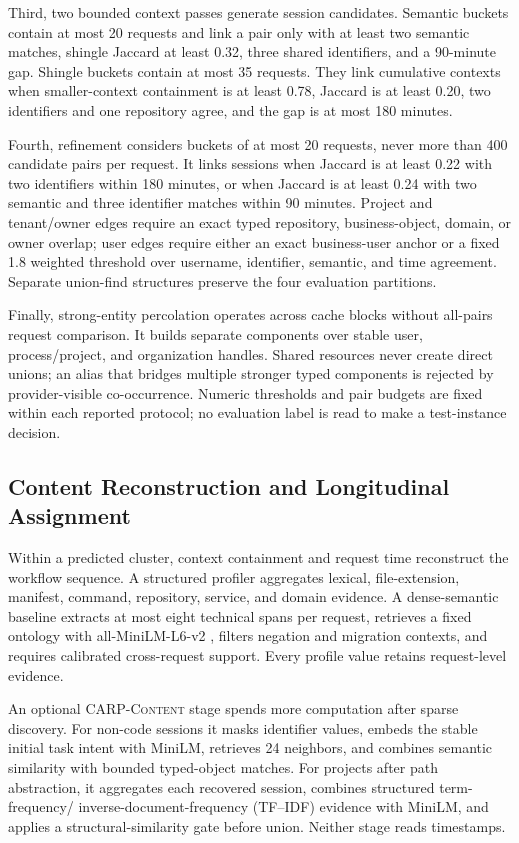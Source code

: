 \documentclass[letterpaper]{article}
\newcommand{\carpcontent}{\textsc{CARP-Content}\xspace}
\begin{document}
Third, two bounded context passes generate session candidates. Semantic buckets contain at most 20
requests and link a pair only with at least two semantic matches, shingle Jaccard at least 0.32,
three shared identifiers, and a 90-minute gap. Shingle buckets contain at most 35 requests. They link
cumulative contexts when smaller-context containment is at least 0.78, Jaccard is at least 0.20, two
identifiers and one repository agree, and the gap is at most 180 minutes.

Fourth, refinement considers buckets of at most 20 requests, never more than 400 candidate pairs
per request. It links sessions when Jaccard is at least 0.22 with two identifiers within 180
minutes, or when Jaccard is at least 0.24 with two semantic and three identifier matches within 90
minutes. Project and tenant/owner edges require an exact
typed repository, business-object, domain, or owner overlap; user edges require either an exact
business-user anchor or a fixed 1.8 weighted threshold over username, identifier, semantic, and
time agreement. Separate union-find structures preserve the four evaluation partitions.

Finally, strong-entity percolation operates across cache blocks without all-pairs request
comparison. It builds separate components over stable user, process/project, and organization
handles. Shared resources never create direct unions; an alias that bridges multiple stronger typed
components is rejected by provider-visible co-occurrence. Numeric thresholds and pair budgets are
fixed within each reported protocol; no evaluation label is read to make a test-instance decision.

\subsection{Content Reconstruction and Longitudinal Assignment}

Within a predicted cluster, context containment and request time reconstruct the workflow sequence.
A structured profiler aggregates lexical, file-extension, manifest, command, repository, service,
and domain evidence. A dense-semantic baseline extracts at most eight technical spans per request,
retrieves a fixed ontology with all-MiniLM-L6-v2
\cite{reimers2019sentencebert,wang2020minilm}, filters negation and migration contexts, and requires
calibrated cross-request support. Every profile value retains request-level evidence.

An optional \carpcontent stage spends more computation after sparse discovery. For non-code
sessions it masks identifier values, embeds the stable initial task intent with MiniLM, retrieves 24
neighbors, and combines semantic similarity with bounded typed-object matches. For projects after
path abstraction, it aggregates each recovered session, combines structured term-frequency/
inverse-document-frequency (TF--IDF) evidence with MiniLM,
and applies a structural-similarity gate before union. Neither stage reads timestamps.
\end{document}
